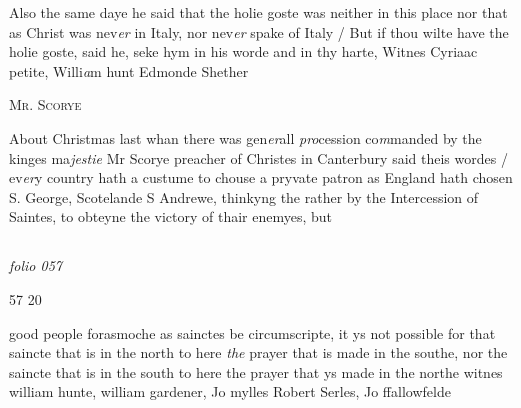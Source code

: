 \documentclass[12pt, a4paper]{book}
\begin{document}
		\ifthenelse{\isodd{\thepage}}
		{\reversemarginpar}
		{\normalmarginpar}
		Also the same daye he said that the holie goste was
 neither in this place nor that as Christ was nev\textit{er} in
 Italy, nor nev\textit{er} spake of Italy / But if thou wilte
 have the holie goste, said he, seke hym in his worde
 and in thy harte, Witnes Cyriaac petite, Willi\textit{a}m
 hunt Edmonde Shether
               	
 

               
                  
				\begin{center}  {\scshape Mr. Scorye}  \end{center}
			
               	
               		
				\marginpar[\vspace{0.5cm}{\textcolor{Gray}{seditious}}]{}
			
               		
		\ifthenelse{\isodd{\thepage}}
		{\reversemarginpar}
		{\normalmarginpar}
		About Christmas last whan there was gen\textit{er}all
 \textit{pro}cession co\textit{m}manded by the kinges ma\textit{jestie} Mr Scorye
               			preacher of Christes in Canterbury said theis wordes /
 ev\textit{er}y country hath a custume to chouse a pryvate patron
               	as England hath chosen S. George, Scotelande S
 Andrewe, thinkyng the rather by the Intercession of
 Saintes, to obteyne the victory of thair enemyes, but



\dotfill
						\newpage {} \subsection*{}

\textit{folio 057}


\begin{flushright}{\color{Mahogany}57} 20\end{flushright}
	
				\marginpar[\vspace{0.5cm}{\textcolor{Gray}{+}}]{}
			
		
		\ifthenelse{\isodd{\thepage}}
		{\reversemarginpar}
		{\normalmarginpar}
		good people forasmoche as sainctes be circumscripte, it ys
 not possible for that saincte that is in the north to here \textit{the}
 prayer that is made in the southe, nor the saincte that is
 in the south to here the prayer that ys made in the northe
 witnes william hunte, william gardener, Jo mylles
  Robert Serles, Jo ffallowfelde
\end{document}
